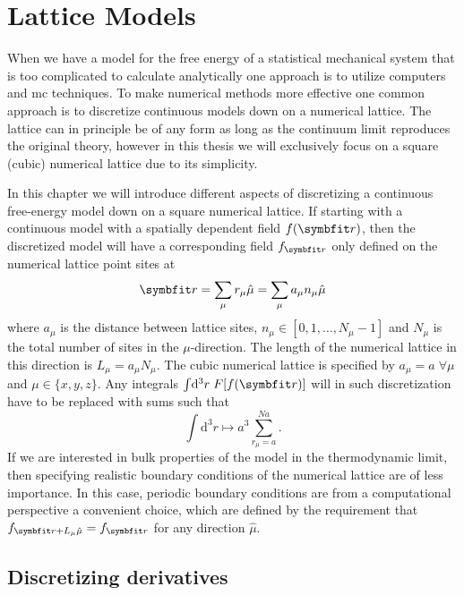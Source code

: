 \chapter{Lattice Models}
\label{sec:LM}
%
\noindent When we have a model for the free energy of a statistical mechanical system that is too complicated to
calculate analytically one approach is to utilize computers and \ac{mc} techniques. To make numerical
methods more effective one common approach is to discretize continuous models down on a 
numerical lattice. The lattice can in principle be of any form as long as the continuum limit reproduces
the original theory, however in this thesis we will exclusively focus on a square (cubic) numerical lattice
due to its simplicity.

In this chapter we will introduce different aspects of discretizing a continuous free-energy model down
on a square numerical lattice. If starting with a continuous model with a spatially dependent field
$f(\v{r})$, then the discretized model will have a corresponding field $f_\v{r}$ only defined on the
numerical lattice point sites at
\begin{equation}
    \label{eq:LM:latticeSites}
    \v{r} = \sum_\mu r_\mu\hat{\mu} = \sum_\mu a_\mu n_\mu\hat{\mu}
\end{equation}
where $a_\mu$ is the distance between lattice sites, $n_\mu\in[0,1,\ldots,N_\mu-1]$ and $N_\mu$ is the total number of sites in the $\mu$-direction.
The length of the numerical lattice in this direction is $L_\mu = a_\mu N_\mu$. The cubic numerical lattice
is specified by $a_\mu = a\;\forall\mu$ and $\mu\in\{x,y,z\}$.
Any integrals $\int\!\mathrm{d}^3r\;F[f(\v{r})]$ will
in such discretization have to be replaced with sums such that
\begin{equation}
    \label{eq:LM:integrals}
    \int\!\mathrm{d}^3r \mapsto a^3\sum_{r_\mu=a}^{Na}.
\end{equation}
If we are interested in bulk properties of the model in the thermodynamic limit, then specifying realistic
boundary conditions of the numerical lattice are of less importance. In this case, periodic boundary conditions
are from a computational perspective a convenient choice, which are defined by the requirement that
$f_{\v{r}+L_\mu\hat{\mu}} = f_\v{r}$ for any direction $\hat{\mu}$.

\section{Discretizing derivatives}

